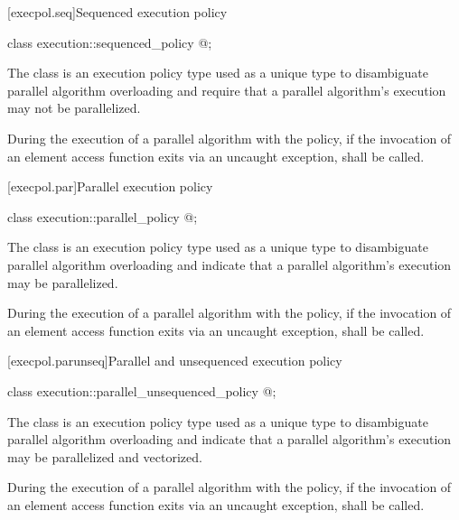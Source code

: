 [execpol.seq]{Sequenced execution policy}

%
\begin{itemdecl}
class execution::sequenced_policy { @\unspec@ };
\end{itemdecl}

\begin{itemdescr}
\pnum
The class  is an execution policy type used
as a unique type to disambiguate parallel algorithm overloading and require
that a parallel algorithm's execution may not be parallelized.

\pnum
During the execution of a parallel algorithm with
the  policy,
if the invocation of an element access function exits via an uncaught exception,
 shall be called.
\end{itemdescr}

[execpol.par]{Parallel execution policy}

%
\begin{itemdecl}
class execution::parallel_policy { @\unspec@ };
\end{itemdecl}

\begin{itemdescr}
\pnum
The class  is an execution policy type used as
a unique type to disambiguate parallel algorithm overloading and indicate that
a parallel algorithm's execution may be parallelized.

\pnum
During the execution of a parallel algorithm with
the  policy,
if the invocation of an element access function exits via an uncaught exception,
 shall be called.
\end{itemdescr}

[execpol.parunseq]{Parallel and unsequenced execution policy}

%
\begin{itemdecl}
class execution::parallel_unsequenced_policy { @\unspec@ };
\end{itemdecl}

\begin{itemdescr}
\pnum
The class  is an execution policy type
used as a unique type to disambiguate parallel algorithm overloading and
indicate that a parallel algorithm's execution may be parallelized and
vectorized.

\pnum
During the execution of a parallel algorithm with
the  policy,
if the invocation of an element access function exits via an uncaught exception,
 shall be called.
\end{itemdescr}

